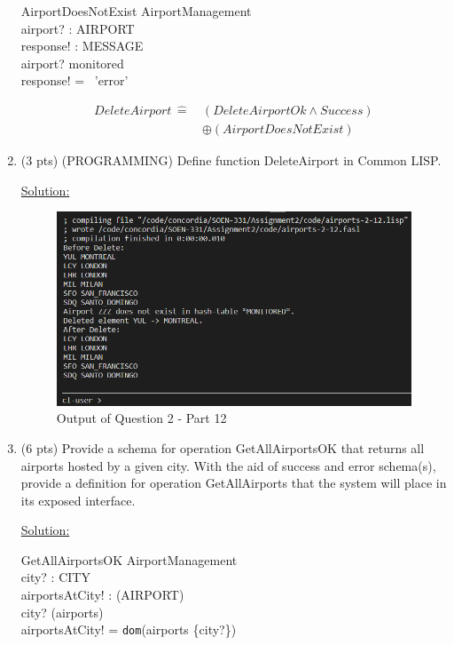 \documentclass[12pt]{article}
\begin{document}
\begin{spacing}{1.5}
\begin{enumerate}
		      \begin{schema}{AirportDoesNotExist}
		      	\Xi AirportManagement \\
		      	airport? : AIRPORT \\
		      	response! : MESSAGE \\
		      	\where
		      	airport? \notin monitored \\
		      	response! = \, 'error' \\
		      \end{schema}
		      \begin{align*}
		      	DeleteAirport \, \hat{=} \, & (DeleteAirportOk \land Success) \\
		      	                            & \oplus (AirportDoesNotExist)    
		      \end{align*}
		      
		\item (3 pts) (PROGRAMMING) Define function DeleteAirport in Common LISP.
		              
		      \underline{Solution:}
		      
		      
		      \begin{figure}[htp]
		      	\centering
		      	\includegraphics[width=1\textwidth]{static/airports-2-12.PNG}
		      	\caption{Output of Question 2 - Part 12}
		      \end{figure}
		      \newpage
		\item (6 pts) Provide a schema for operation GetAllAirportsOK that returns all airports
		      hosted by a given city. With the aid of success and error schema(s), provide a definition
		      for operation GetAllAirports that the system will place in its exposed interface.
		      
		      \underline{Solution:}
		      \begin{schema}{GetAllAirportsOK}
		      	\Xi AirportManagement \\
		      	city? : CITY \\
		      	airportsAtCity! : (AIRPORT) \\
		      	\where
		      	city? \in {}(airports) \\
		      	airportsAtCity! = \texttt{dom}(airports \rres \{city?\})
		      \end{schema}
		      

\end{enumerate}
\end{spacing}
\end{document}
